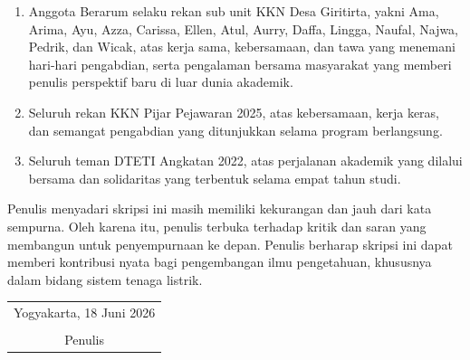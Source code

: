 \begin{enumerate}
	\item Anggota Berarum selaku rekan sub unit KKN Desa Giritirta, yakni Ama, Arima, Ayu, Azza, Carissa, Ellen, Atul, Aurry, Daffa, Lingga, Naufal, Najwa, Pedrik, dan Wicak, atas kerja sama, kebersamaan, dan tawa yang menemani hari-hari pengabdian, serta pengalaman bersama masyarakat yang memberi penulis perspektif baru di luar dunia akademik.

	\item Seluruh rekan KKN Pijar Pejawaran 2025, atas kebersamaan, kerja keras, dan semangat pengabdian yang ditunjukkan selama program berlangsung.

	\item Seluruh teman DTETI Angkatan 2022, atas perjalanan akademik yang dilalui bersama dan solidaritas yang terbentuk selama empat tahun studi.

\end{enumerate}

Penulis menyadari skripsi ini masih memiliki kekurangan dan jauh dari kata sempurna. Oleh karena itu, penulis terbuka terhadap kritik dan saran yang membangun untuk penyempurnaan ke depan. Penulis berharap skripsi ini dapat memberi kontribusi nyata bagi pengembangan ilmu pengetahuan, khususnya dalam bidang sistem tenaga listrik.

\begin{flushright}
	\begin{tabular}{c}
		Yogyakarta, 18 Juni 2026 \\
		\vspace{1cm} \\
		Penulis
	\end{tabular}
\end{flushright}
